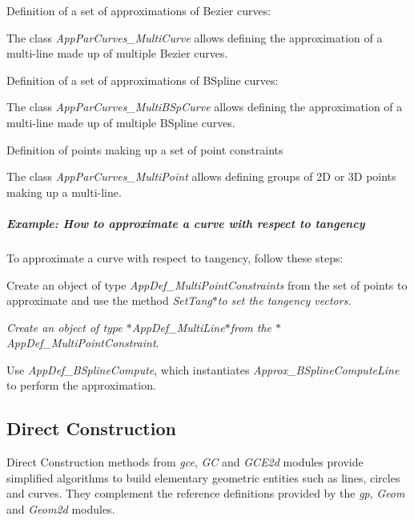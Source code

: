 \begin{DoxyItemize}
\item Definition of a set of approximations of Bezier curves\+:
\end{DoxyItemize}

The class {\itshape App\+Par\+Curves\+\_\+\+Multi\+Curve} allows defining the approximation of a multi-\/line made up of multiple Bezier curves.


\begin{DoxyItemize}
\item Definition of a set of approximations of B\+Spline curves\+:
\end{DoxyItemize}

The class {\itshape App\+Par\+Curves\+\_\+\+Multi\+B\+Sp\+Curve} allows defining the approximation of a multi-\/line made up of multiple B\+Spline curves.


\begin{DoxyItemize}
\item Definition of points making up a set of point constraints
\end{DoxyItemize}

The class {\itshape App\+Par\+Curves\+\_\+\+Multi\+Point} allows defining groups of 2D or 3D points making up a multi-\/line.

\subparagraph*{Example\+: How to approximate a curve with respect to tangency}

To approximate a curve with respect to tangency, follow these steps\+:


\begin{DoxyEnumerate}
\item Create an object of type {\itshape App\+Def\+\_\+\+Multi\+Point\+Constraints} from the set of points to approximate and use the method {\itshape Set\+Tang$\ast$to set the tangency vectors.}
\item {\itshape Create an object of type $\ast$\+App\+Def\+\_\+\+Multi\+Line$\ast$from the $\ast$\+App\+Def\+\_\+\+Multi\+Point\+Constraint}.
\item Use {\itshape App\+Def\+\_\+\+B\+Spline\+Compute}, which instantiates {\itshape Approx\+\_\+\+B\+Spline\+Compute\+Line} to perform the approximation.
\end{DoxyEnumerate}\hypertarget{occt_user_guides__modeling_data_occt_modat_1_2}{}\subsection{Direct Construction}\label{occt_user_guides__modeling_data_occt_modat_1_2}
Direct Construction methods from {\itshape gce}, {\itshape GC} and {\itshape G\+C\+E2d} modules provide simplified algorithms to build elementary geometric entities such as lines, circles and curves. They complement the reference definitions provided by the {\itshape gp}, {\itshape Geom} and {\itshape Geom2d} modules.

